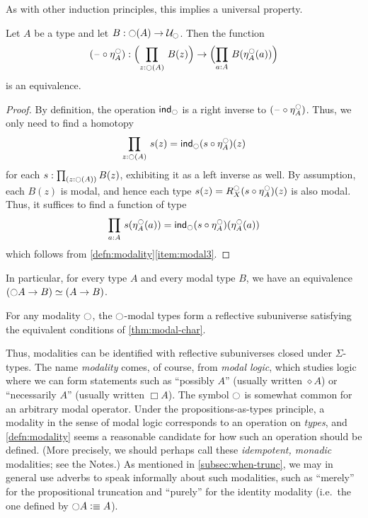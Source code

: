 %
As with other induction principles, this implies a universal property.

\begin{thm}\label{prop:lv_n_deptype_sec_equiv_by_precomp}
Let $A$ be a type and let $B:\ocircle(A)\to\mathcal{U}_{\ocircle}$. Then the function
\begin{equation*}
(\blank\circ \mreturn^\modal_A) : \Parens{\prd{z:\modal(A)}B(z)} \to \Parens{\prd{a:A}B(\mreturn^\modal_A(a))}
\end{equation*}
is an equivalence.
\end{thm}
\begin{proof}
By definition, the operation $\mathsf{ind}_{\ocircle}$ is a right inverse to $(\mathord{\hspace{1pt}\text{--}\hspace{1pt}}\circ \eta^{\ocircle}_A)$.
Thus, we only need to find a homotopy
\begin{equation*}
\prd{z:\modal(A)}s(z)= \ind{\modal}(s\circ \mreturn^\modal_A)(z)
\end{equation*}
for each $s:\prd{z:\modal(A)}B(z)$, exhibiting it as a left inverse as well.
By assumption, each $B(z)$ is modal, and hence each type $s(z)= R^{\ocircle}_X(s\circ \eta^{\ocircle}_A)(z)$
is also modal.
Thus, it suffices to find a function of type
\begin{equation*}
\prd{a:A}s(\mreturn^\modal_A(a))= \ind{\modal}(s\circ \mreturn^\modal_A)(\mreturn^\modal_A(a))
\end{equation*}
which follows from \cref{defn:modality}\ref{item:modal3}.
\end{proof}

In particular, for every type $A$ and every modal type $B$, we have an equivalence $(\ocircle A\to B)\simeq (A\to B)$.

\begin{cor}
  For any modality $\ocircle$, the $\ocircle$-modal types form a reflective subuniverse satisfying the equivalent conditions of \cref{thm:modal-char}.
\end{cor}

Thus, modalities can be identified with reflective subuniverses closed under $\Sigma$-types.
The name \emph{modality} comes, of course, from \emph{modal logic}, which studies logic where we can form statements such as ``possibly $A$'' (usually written $\diamond A$) or ``necessarily $A$'' (usually written $\Box A$).
The symbol $\ocircle$ is somewhat common for an arbitrary modal operator. %
Under the propositions-as-types principle, a modality in the sense of modal logic corresponds to an operation on \emph{types}, and \cref{defn:modality} seems a reasonable candidate for how such an operation should be defined.
(More precisely, we should perhaps call these \emph{idempotent, monadic} modalities; see the Notes.)
%
As mentioned in \cref{subsec:when-trunc}, we may in general use adverbs to speak informally about such modalities, such as ``merely'' for the propositional truncation and ``purely'' for the identity modality
%
%
(i.e.\ the one defined by $\ocircle A \vcentcolon\equiv A$).

